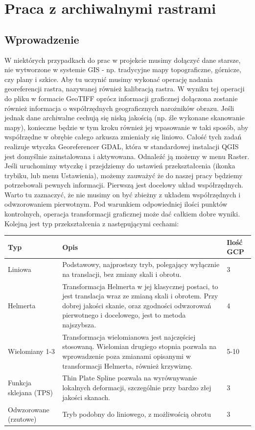 \documentclass[a4paper,11pt, onecolumn, openany]{memoir}
\begin{document}
	\chapter{Praca z archiwalnymi rastrami}
		\section{Wprowadzenie}
W niektórych przypadkach do prac w projekcie musimy dołączyć dane starsze, nie wytworzone w systemie GIS - np. tradycyjne mapy topograficzne, górnicze, czy plany i szkice. Aby tu uczynić musimy wykonać operację nadania georeferencji rastra, nazywanej również kalibracją rastra. W wyniku tej operacji do pliku w formacie GeoTIFF oprócz informacji graficznej dołączona zostanie również informacja o współrzędnych geograficznych narożników obrazu. Jeśli jednak dane archiwalne cechują się niską jakością (np. źle wykonane skanowanie mapy), konieczne będzie w tym kroku również jej wpasowanie w taki sposób, aby współrzędne w obrębie całego arkusza zmieniały się liniowo.
Całość tych zadań realizuje wtyczka Georeferencer GDAL, która w standardowej instalacji QGIS jest domyślnie zainstalowana i aktywowana. Odnaleźć ją możemy w menu Raster.
Jeśli uruchomimy wtyczkę i przejdziemy do ustawień przekształcenia (ikonka trybiku, lub menu Ustawienia), możemy zauważyć że do naszej pracy będziemy potrzebowali pewnych informacji. Pierwszą jest docelowy układ współrzędnych. Warto tu zaznaczyć, że nie musimy on być zbieżny z układem współrzędnych i odwzorowaniem pierwotnym. Pod warunkiem odpowiedniej ilości punktów kontrolnych, operacja transformacji graficznej może dać całkiem dobre wyniki. Kolejną jest typ przekształcenia z następującymi cechami:\\
		\begin{tabular}{|p{}|p{}|p{}|}
	\hline
	Typ & Opis & Ilość GCP \\
	\hline
	Liniowa & Podstawowy, najprostszy tryb, polegający wyłącznie na translacji, bez zmiany skali i obrotu. & 3 \\
	\hline
	Helmerta & Transformacja Helmerta w jej klasycznej postaci, to jest translacja wraz ze zmianą skali i obrotem. Przy dobrej jakości skanie, oraz zgodności odwzorowań pierwotnego i docelowego, jest to metoda najszybsza. & 4 \\
	\hline
	Wielomiany 1-3 & Transformacja wielomianowa jest najczęściej stosowaną. Wielomian drugiego stopnia pozwala na wprowadzenie poza zmianami opisanymi w transformacji Helmerta, również krzywiznę.  & 5-10 \\
	\hline
	Funkcja sklejana (TPS) & Thin Plate Spline pozwala na wyrównywanie lokalnych deformacji, szczególnie przy bardzo złej jakości skanach. & 3 \\
	\hline
	Odwzorowane (rzutowe) & Tryb podobny do liniowego, z możliwością obrotu & 3 \\
	\hline
		\end{tabular}\\
\end{document}
